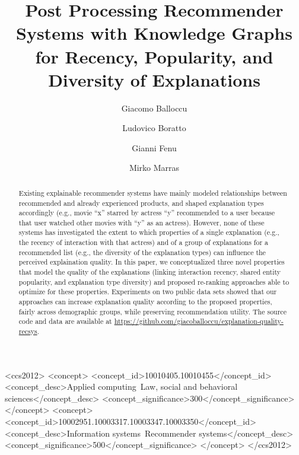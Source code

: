 \documentclass[sigconf]{acmart}
\begin{document}
\fancyhead{}

\title[Post Processing Recommender Systems with Knowledge Graphs for Recency, Popularity, and Diversity of Explanations]{Post Processing Recommender Systems with Knowledge Graphs for Recency, Popularity, and Diversity of Explanations}

\author{Giacomo Balloccu}

\author{Ludovico Boratto}

\author{Gianni Fenu}

\author{Mirko Marras}

\begin{abstract}
Existing explainable recommender systems have mainly modeled relationships between recommended and already experienced products, and shaped explanation types accordingly (e.g., movie ``x'' starred by actress ``y'' recommended to a user because that user watched other movies with ``y'' as an actress). 
However, none of these systems has investigated the extent to which properties of a single explanation (e.g., the recency of interaction with that actress) and of a group of explanations for a recommended list (e.g., the diversity of the explanation types) can influence the perceived explaination quality.
In this paper, we conceptualized three novel properties that model the quality of the explanations (linking interaction recency, shared entity popularity, and explanation type diversity) and proposed re-ranking approaches able to optimize for these properties.
Experiments on two public data sets showed that our approaches can increase explanation quality according to the proposed properties, fairly across demographic groups, while preserving recommendation utility.
The source code and data are available at \url{https://github.com/giacoballoccu/explanation-quality-recsys}. 
\end{abstract}

\begin{CCSXML}
 <ccs2012>
    <concept>
    <concept_id>10010405.10010455</concept_id>
    <concept_desc>Applied computing~Law, social and behavioral sciences</concept_desc>
    <concept_significance>300</concept_significance>
    </concept>
    <concept>
    <concept_id>10002951.10003317.10003347.10003350</concept_id>
    <concept_desc>Information systems~Recommender systems</concept_desc>
    <concept_significance>500</concept_significance>
    </concept>
 </ccs2012>
\end{CCSXML}
\end{document}
